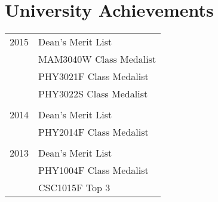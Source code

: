 
\section{University Achievements}

\begin{tabular}{R{2.5cm}|l}
2015 & Dean's Merit List\\
 & MAM3040W Class Medalist\\
 & PHY3021F Class Medalist\\
 & PHY3022S Class Medalist\\
&\\
2014 & Dean's Merit List\\
 & PHY2014F Class Medalist\\
&\\
2013 & Dean's Merit List\\
&PHY1004F Class Medalist\\
&CSC1015F Top 3\\
\end{tabular}


